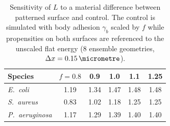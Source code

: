 \begin{table}[h]\centering\small
\caption{Sensitivity of $L$ to a material difference between patterned surface and control. The control is simulated with body adhesion $\gamma_b$ scaled by $f$ while propensities on both surfaces are referenced to the unscaled flat energy (8 ensemble geometries, $\Delta x=\SI{0.15}{\micrometre}$).}\label{tab:chem}
\begin{tabular}{lccccc}\toprule Species & $f=0.8$ & 0.9 & 1.0 & 1.1 & 1.25\\\midrule
\textit{E.~coli} & 1.19 & 1.34 & 1.47 & 1.48 & 1.48\\
\textit{S.~aureus} & 0.83 & 1.02 & 1.18 & 1.25 & 1.25\\
\textit{P.~aeruginosa} & 1.17 & 1.29 & 1.39 & 1.40 & 1.40\\
\bottomrule\end{tabular}\end{table}
